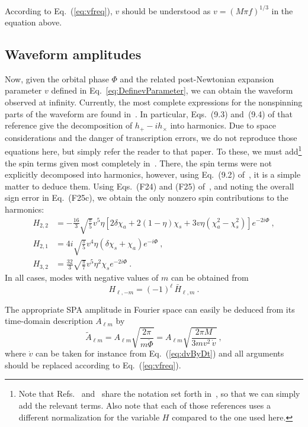 %
According to Eq.~(\ref{eq:vfreq}), $v$ should be understood as $v =
(M \pi f)^{1/3}$ in the equation above.

\subsection{Waveform amplitudes}
\label{sec:WaveformAmplitudes}
Now, given the orbital phase $\Phi$ and the related post-Newtonian
expansion parameter $v$ defined in Eq.~\eqref{eq:DefinevParameter}, we
can obtain the waveform observed at infinity.  Currently, the most complete
expressions for the nonspinning parts of the waveform are
found in~\cite{Blanchet:2008}.  In particular, Eqs.~(9.3) and~(9.4) of
that reference give the decomposition of $h_+ - ih_\times$ into
harmonics.  Due to space
considerations and the danger of transcription errors, we do not
reproduce those equations here, but simply refer the reader to that
paper.  To these, we must add\footnote{Note that
  Refs.~\cite{Blanchet:2008} and~\cite{WillWiseman:1996} share the
  notation set forth in~\cite{Blanchet:1996}, so that we can simply
  add the relevant terms.  Also note that each of those references
  uses a different normalization for the variable $H$ compared to the
  one used here.}  the spin terms given most completely
in~\cite{WillWiseman:1996}.  There, the spin terms were not explicitly
decomposed into harmonics, however, using Eq.~(9.2)
of~\cite{Blanchet:2008}, it is a simple matter to deduce them.  Using
Eqs.~(F24) and (F25) of~\cite{WillWiseman:1996}, and noting the
overall sign error in Eq.~(F25c), we obtain the only nonzero spin
contributions to the harmonics:
\begin{align}
  \label{eq:SpinAmplitudeTerms}
  H_{2,2} &= -\frac{16}{3} \sqrt{\frac{\pi}{5}} v^5 \eta \left[2 \delta
    \chi_{a} + 2(1-\eta) \chi_{s} + 3 v \eta \left(\chi_{a}^2 -
      \chi_{s}^2 \right) \right] e^{-2 i \Phi}~, \\
  H_{2,1} &= 4 i \sqrt{\frac{\pi}{5}} v^4 \eta (\delta \chi_{s} +
  \chi_{a}) e^{-i \Phi}~, \\
  H_{3,2} &= \frac{32}{3} \sqrt{\frac{\pi}{7}} v^5 \eta^2 \chi_{s}
  e^{-2 i \Phi}~.
\end{align}
In all cases, modes with negative values of $m$ can be obtained from
\begin{equation}
  \label{eq:NegativeMModes}
  H_{\ell, -m} = (-1)^{\ell}\, \bar{H}_{\ell,m}~.
\end{equation}

The appropriate SPA amplitude in Fourier space can easily be deduced
from its time-domain description $A_{\ell m}$ by
\begin{equation}
 \tilde A_{\ell m} = A_{\ell m} \sqrt{\frac{2\pi}{m \ddot \Phi}} =
A_{\ell m} \sqrt{\frac{2 \pi M}{3m v^2 \, \dot v}}~,
\end{equation}
where $\dot v$ can be taken for instance from Eq.~(\ref{eq:dvByDt})
and all arguments should be replaced according to
Eq.~(\ref{eq:vfreq}).


